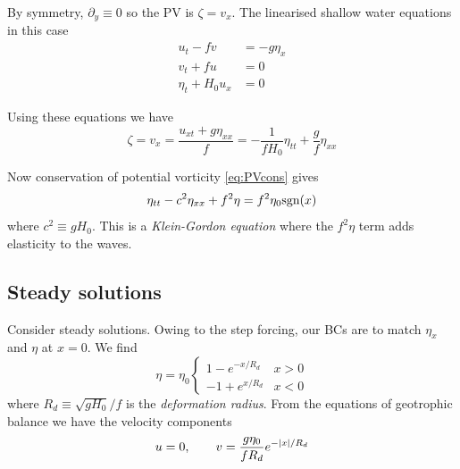 \documentclass{jknotes}
\begin{document}
By symmetry, $\partial_y \equiv 0$ so the PV is $\zeta = v_x$. The linearised
shallow water equations in this case
\begin{align}
	u_t - fv &= -g\eta_x \\
	v_t + fu &= 0 \\
	\eta_t + H_0 u_x &= 0
\end{align}

Using these equations we have
\begin{equation}
	\zeta = v_x = \frac{u_{xt} + g\eta_{xx}}{f} = -\frac{1}{f H_0} \eta_{tt} +
	\frac{g}{f}\eta_{xx}
\end{equation}

Now conservation of potential vorticity \eqref{eq:PVcons} gives
\begin{equation}
	\eta_{tt} - c^2 \eta_{xx} + f^2 \eta = f^2 \eta_0 \text{sgn}(x)
\end{equation}
where $c^2 \equiv g H_0$. This is a \emph{Klein-Gordon equation} where the
$f^2\eta$ term adds elasticity to the waves.

\subsection{Steady solutions}
Consider steady solutions. Owing to the step forcing, our BCs are to match
$\eta_x$ and $\eta$ at $x=0$. We find
\begin{equation}
	\eta = \eta_0 \begin{cases} 1 - e^{-x/R_d} & x > 0 \\ -1 + e^{x/R_d} & x <
	0 \end{cases} \label{eq:gasoln}
\end{equation}
where $R_d \equiv \sqrt{gH_0}/f$ is the \emph{deformation radius}. From the
equations of geotrophic balance we have the velocity components
\begin{equation}
	u = 0, \hspace{2em} v = \frac{g \eta_0}{fR_d} e^{-\abs{x}/R_d}
\end{equation}
\begin{center}
\end{center}
\end{document}
